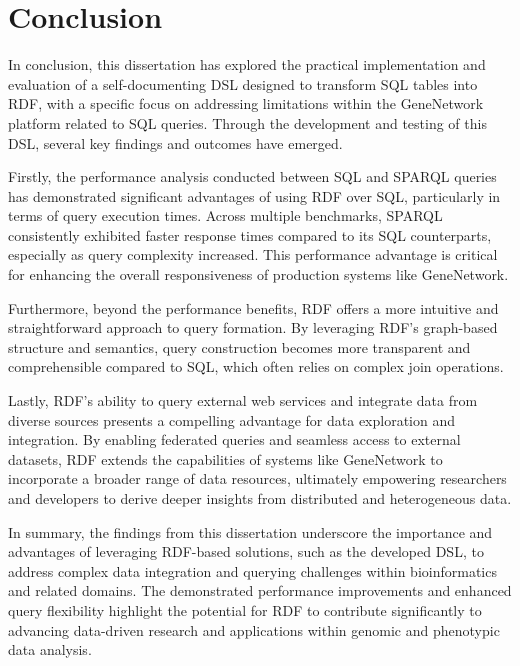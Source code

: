 \chapter{Conclusion}

In conclusion, this dissertation has explored the practical implementation and evaluation of a self-documenting DSL designed to transform SQL tables into RDF, with a specific focus on addressing limitations within the GeneNetwork platform related to SQL queries. Through the development and testing of this DSL, several key findings and outcomes have emerged.

Firstly, the performance analysis conducted between SQL and SPARQL queries has demonstrated significant advantages of using RDF over SQL, particularly in terms of query execution times. Across multiple benchmarks, SPARQL consistently exhibited faster response times compared to its SQL counterparts, especially as query complexity increased. This performance advantage is critical for enhancing the overall responsiveness of production systems like GeneNetwork.

Furthermore, beyond the performance benefits, RDF offers a more intuitive and straightforward approach to query formation. By leveraging RDF's graph-based structure and semantics, query construction becomes more transparent and comprehensible compared to SQL, which often relies on complex join operations.

Lastly, RDF's ability to query external web services and integrate data from diverse sources presents a compelling advantage for data exploration and integration. By enabling federated queries and seamless access to external datasets, RDF extends the capabilities of systems like GeneNetwork to incorporate a broader range of data resources, ultimately empowering researchers and developers to derive deeper insights from distributed and heterogeneous data.

In summary, the findings from this dissertation underscore the importance and advantages of leveraging RDF-based solutions, such as the developed DSL, to address complex data integration and querying challenges within bioinformatics and related domains. The demonstrated performance improvements and enhanced query flexibility highlight the potential for RDF to contribute significantly to advancing data-driven research and applications within genomic and phenotypic data analysis.


